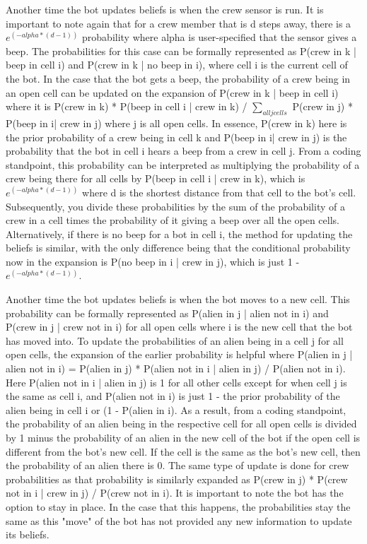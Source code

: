 \documentclass[11pt]{article}
\begin{document}
\medskip

Another time the bot updates beliefs is when the crew sensor is run. It is important to note again that for a crew member that is d steps away, there is a $e^{(-alpha * (d-1))}$ probability where alpha is user-specified that the sensor gives a beep. The probabilities for this case can be formally represented as P(crew in k | beep in cell i) and P(crew in k | no beep in i), where cell i is the current cell of the bot. In the case that the bot gets a beep, the probability of a crew being in an open cell can be updated on the expansion of P(crew in k | beep in cell i) where it is P(crew in k) * P(beep in cell i | crew in k) / $\sum_{all j cells}$ P(crew in j) * P(beep in i| crew in j) where j is all open cells. In essence, P(crew in k) here is the prior probability of a crew being in cell k and P(beep in i| crew in j) is the probability that the bot in cell i hears a beep from a crew in cell j. From a coding standpoint, this probability can be interpreted as multiplying the probability of a crew being there for all cells by P(beep in cell i | crew in k), which is $e^{(-alpha * (d-1))}$ where d is the shortest distance from that cell to the bot's cell. Subsequently, you divide these probabilities by the sum of the probability of a crew in a cell times the probability of it giving a beep over all the open cells. Alternatively, if there is no beep for a bot in cell i, the method for updating the beliefs is similar, with the only difference being that the conditional probability now in the expansion is P(no beep in i | crew in j), which is just 1 - $e^{(-alpha * (d-1))}$. 

\medskip

Another time the bot updates beliefs is when the bot moves to a new cell. This probability can be formally represented as P(alien in j | alien not in i) and P(crew in j | crew not in i) for all open cells where i is the new cell that the bot has moved into. To update the probabilities of an alien being in a cell j for all open cells, the expansion of the earlier probability is helpful where P(alien in j | alien not in i) = P(alien in j) * P(alien not in i | alien in j) / P(alien not in i). Here P(alien not in i | alien in j) is 1 for all other cells except for when cell j is the same as cell i, and P(alien not in i) is just 1 - the prior probability of the alien being in cell i or (1 - P(alien in i). As a result, from a coding standpoint, the probability of an alien being in the respective cell for all open cells is divided by 1 minus the probability of an alien in the new cell of the bot if the open cell is different from the bot's new cell. If the cell is the same as the bot's new cell, then the probability of an alien there is 0. The same type of update is done for crew probabilities as that probability is similarly expanded as P(crew in j) * P(crew not in i | crew in j) / P(crew not in i). It is important to note the bot has the option to stay in place. In the case that this happens, the probabilities stay the same as this "move" of the bot has not provided any new information to update its beliefs. 
\end{document}

